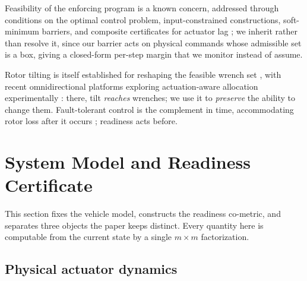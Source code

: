 \documentclass[letter, 10 pt, journal, twoside]{IEEEtran}
\theoremstyle{compact}
\begin{document}
Feasibility of the enforcing program is a known concern, addressed through conditions on the optimal control problem, input-constrained constructions, soft-minimum barriers, and composite certificates for actuator lag \cite{Ames2019}; we inherit rather than resolve it, since our barrier acts on physical commands whose admissible set is a box, giving a closed-form per-step margin that we monitor instead of assume.

Rotor tilting is itself established for reshaping the feasible wrench set \cite{Rashad2020, Allenspach2020}, with recent omnidirectional platforms exploring actuation-aware allocation experimentally \cite{Hamandi2025prototype, Pretto2026}: there, tilt \emph{reaches} wrenches; we use it to \emph{preserve} the ability to change them. Fault-tolerant control is the complement in time, accommodating rotor loss after it occurs \cite{Mueller2014}; readiness acts before.




\section{System Model and Readiness Certificate}
\label{sec:model}

This section fixes the vehicle model, constructs the readiness co-metric, and separates three objects the paper keeps distinct. Every quantity here is computable from the current state by a single $m\times m$ factorization.



\subsection{Physical actuator dynamics}
\label{sec:actuators}
\end{document}
